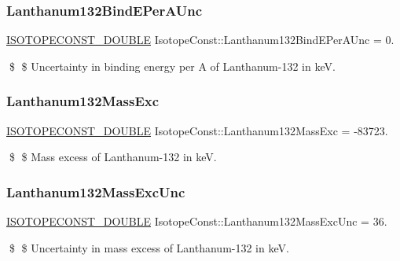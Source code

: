 \subsubsection{\texorpdfstring{Lanthanum132\+Bind\+E\+Per\+A\+Unc}{Lanthanum132BindEPerAUnc}}
{\footnotesize\ttfamily \mbox{\hyperlink{group___isotope_const-_macros_ga8f45a7272ce02c0b4c65c44636ed719a}{I\+S\+O\+T\+O\+P\+E\+C\+O\+N\+S\+T\+\_\+\+D\+O\+U\+B\+LE}} Isotope\+Const\+::\+Lanthanum132\+Bind\+E\+Per\+A\+Unc = 0.}

\$ \$ Uncertainty in binding energy per A of Lanthanum-\/132 in keV. \mbox{\label{group___isotope_const-_lanthanum-_la132_gadcb4c15c4b6c701fd99332e0be24931d}} 
\subsubsection{\texorpdfstring{Lanthanum132\+Mass\+Exc}{Lanthanum132MassExc}}
{\footnotesize\ttfamily \mbox{\hyperlink{group___isotope_const-_macros_ga8f45a7272ce02c0b4c65c44636ed719a}{I\+S\+O\+T\+O\+P\+E\+C\+O\+N\+S\+T\+\_\+\+D\+O\+U\+B\+LE}} Isotope\+Const\+::\+Lanthanum132\+Mass\+Exc = -\/83723.}

\$ \$ Mass excess of Lanthanum-\/132 in keV. \mbox{\label{group___isotope_const-_lanthanum-_la132_gae82e3f8ce8f0bcbd8a619cfdb2fe3b3f}} 
\subsubsection{\texorpdfstring{Lanthanum132\+Mass\+Exc\+Unc}{Lanthanum132MassExcUnc}}
{\footnotesize\ttfamily \mbox{\hyperlink{group___isotope_const-_macros_ga8f45a7272ce02c0b4c65c44636ed719a}{I\+S\+O\+T\+O\+P\+E\+C\+O\+N\+S\+T\+\_\+\+D\+O\+U\+B\+LE}} Isotope\+Const\+::\+Lanthanum132\+Mass\+Exc\+Unc = 36.}

\$ \$ Uncertainty in mass excess of Lanthanum-\/132 in keV. \mbox{\label{group___isotope_const-_lanthanum-_la132_gad3afcb8d995748b7962da03a8c590642}} 
